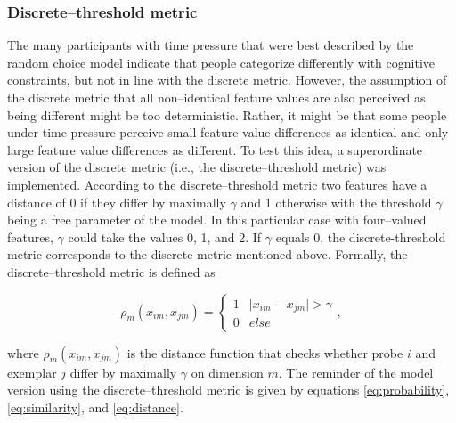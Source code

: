 \documentclass[a4paper,man,natbib]{apa6}
\begin{document}
\subsubsection{Discrete--threshold metric}
The many participants with time pressure that were best described by the random choice model indicate that people categorize differently with cognitive constraints, but not in line with the discrete metric. However, the assumption of the discrete metric that all non--identical feature values are also perceived as being different might be too deterministic. Rather, it might be that some people under time pressure perceive small feature value differences as identical and only large feature value differences as different. 
To test this idea, a superordinate version of the discrete metric (i.e., the discrete--threshold metric) was implemented. According to the discrete--threshold metric two features have a distance of 0 if they differ by maximally $\gamma$ and 1 otherwise with the threshold $\gamma$ being a free parameter of the model. In this particular case with four--valued features, $\gamma$ could take the values 0, 1, and 2. If $\gamma$ equals 0, the discrete-threshold metric corresponds to the discrete metric mentioned above. Formally, the discrete--threshold metric is defined as

\begin{equation}
\rho_{m}(x_{im}, x_{jm}) = 
\begin{cases}
	1 & \mid x_{im} - x_{jm} \mid > \gamma \\
	0 & else 
\end{cases},
\end{equation}

where $\rho_{m}(x_{im}, x_{jm})$ is the distance function that checks whether probe $i$ and exemplar $j$ differ by maximally $\gamma$ on dimension $m$. The reminder of the model version using the discrete--threshold metric is given by equations \ref{eq:probability}, \ref{eq:similarity}, and \ref{eq:distance}. 
\end{document}
